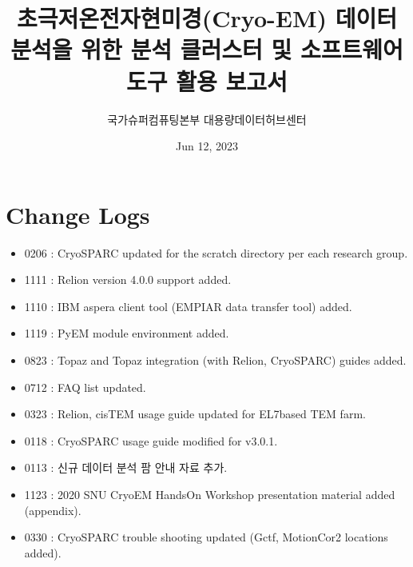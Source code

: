 \documentclass[a4paper,10pt,english]{sphinxmanual}
\title{초극저온전자현미경(Cryo-EM) 데이터 분석을 위한 분석 클러스터 및 소프트웨어 도구 활용 보고서}
\date{Jun 12, 2023}
\author{국가슈퍼컴퓨팅본부 대용량데이터허브센터}
\begin{document}
\pagestyle{empty}
\sphinxmaketitle
\pagestyle{plain}
\sphinxtableofcontents
\pagestyle{normal}
\label{\detokenize{index::doc}}


\sphinxstepscope


\chapter{Change Logs}
\label{\detokenize{changelog:change-logs}}\label{\detokenize{changelog::doc}}\begin{itemize}
\item {} 
\sphinxhyphen{}02\sphinxhyphen{}06 : CryoSPARC updated for the scratch directory per each research group.

\item {} 
\sphinxhyphen{}11\sphinxhyphen{}11 : Relion version 4.0.0 support added.

\item {} 
\sphinxhyphen{}11\sphinxhyphen{}10 : IBM aspera client tool (EMPIAR data transfer tool) added.

\item {} 
\sphinxhyphen{}11\sphinxhyphen{}19 : PyEM module environment added.

\item {} 
\sphinxhyphen{}08\sphinxhyphen{}23 : Topaz and Topaz integration (with Relion, CryoSPARC) guides added.

\item {} 
\sphinxhyphen{}07\sphinxhyphen{}12 : FAQ list updated.

\item {} 
\sphinxhyphen{}03\sphinxhyphen{}23 : Relion, cisTEM usage guide updated for EL7\sphinxhyphen{}based TEM farm.

\item {} 
\sphinxhyphen{}01\sphinxhyphen{}18 : CryoSPARC usage guide modified for v3.0.1.

\item {} 
\sphinxhyphen{}01\sphinxhyphen{}13 : 신규 데이터 분석 팜 안내 자료 추가.

\item {} 
\sphinxhyphen{}11\sphinxhyphen{}23 : 2020 SNU CryoEM Hands\sphinxhyphen{}On Workshop presentation material added (appendix).

\item {} 
\sphinxhyphen{}03\sphinxhyphen{}30 : CryoSPARC trouble shooting updated (Gctf, MotionCor2 locations added).


\end{itemize}
\end{document}
